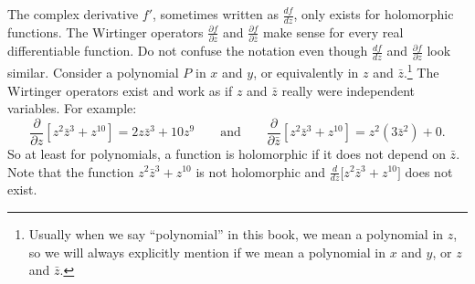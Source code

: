 \documentclass[12pt,openany]{book}
\newcommand{\myquote}[1]{``#1''}
\theoremstyle{plain}
\theoremstyle{remark}
\theoremstyle{definition}
\theoremstyle{exercise}
\theoremstyle{example}
\begin{document}
The complex derivative $f'$, sometimes written as $\frac{df}{dz}$,
only exists for holomorphic functions.
The Wirtinger operators
$\frac{\partial f}{\partial z}$ and
$\frac{\partial f}{\partial \bar{z}}$ make sense for every real differentiable
function.
Do not confuse the notation
even though $\frac{df}{dz}$ and 
$\frac{\partial f}{\partial z}$ look similar.
Consider a polynomial $P$ in $x$ and $y$, or equivalently
in $z$ and $\bar{z}$.\footnote{Usually when we say \myquote{polynomial} in this
book, we mean a polynomial in $z$, so we will always explicitly mention
if we mean a polynomial in $x$ and $y$, or $z$ and $\bar{z}$.}
The Wirtinger operators exist and
work as if $z$ and $\bar{z}$ really were independent variables.  For example:
\begin{equation*}
\frac{\partial}{\partial z}
\left[ z^2 \bar{z}^3 + z^{10} \right]
=
2z \bar{z}^3 + 10 z^{9}
\qquad
\text{and}
\qquad
\frac{\partial}{\partial \bar{z}}
\left[ z^2 \bar{z}^3 + z^{10} \right]
=
z^2 ( 3 \bar{z}^2 ) + 0 .
\end{equation*}
So at least for polynomials, a function is holomorphic 
if it does not depend on $\bar{z}$.
Note that
the function $z^2 \bar{z}^3 + z^{10}$ is not holomorphic
and
$\frac{d}{dz} \bigl[ z^2 \bar{z}^3 + z^{10} \bigr]$
does not exist.
\end{document}
